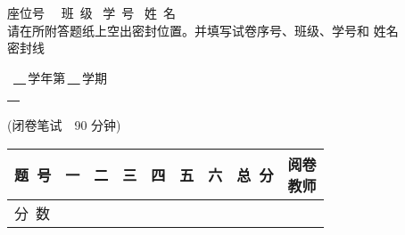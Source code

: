 \fancyhf{}
\sbox{\zdx}
{\parbox{27cm}{\centering
	座位号~\underline{\makebox[34mm][c]{}}~ 班~级\underline{\makebox[34mm][c]{}}~ 学~号\underline{\makebox[44mm][c]{}}~ 姓~名\underline{\makebox[34mm][c]{}} ~\\
	\vspace{3mm}
请在所附答题纸上空出密封位置。并填写试卷序号、班级、学号和 姓名\\
\vspace{1mm}
\dotfill{} 密\dotfill{}封\dotfill{}线\dotfill{} \\
	}}
\reversemarginpar
	
\begin{spacing}{1.25}
	\begin{center}
\begin{LARGE}
\school~\underline{~\xuenian~}\,学年第\,\underline{~\xueqi~}\,学期\\
\underline{~\kecheng~}\,\\
\end{LARGE}
(闭卷笔试\ \ 90 分钟)\\
	\vspace{0.5cm}
\begin{tabular}{|m{}|*{7}{m{}|}p{}|}
	\hline
\centering  题~号 & \centering 一 & \centering 二 & \centering 三 & \centering 四& \centering 五 & \centering 六 %
& \centering 总~分 & \makecell{阅卷\\教师} \rule{0pt}{3mm} \\
	\hline
	\centering 分~数 &  &  &  &  &  &  &  &  %
	\rule{0pt}{8mm} \\\hline
\end{tabular}
\end{center}
\end{spacing}
\vspace{-0.5cm}
\setlength{\marginparsep}{1.7cm}
\putzdx %
\vspace{1cm}
